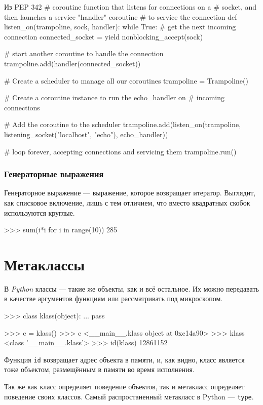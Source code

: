 \begin{pylst}{Из PEP 342}{}
# coroutine function that listens for connections on a
# socket, and then launches a service "handler" coroutine
# to service the connection
def listen_on(trampoline, sock, handler):
    while True:
        # get the next incoming connection
        connected_socket = yield nonblocking_accept(sock)

        # start another coroutine to handle the connection
        trampoline.add(handler(connected_socket))

# Create a scheduler to manage all our coroutines
trampoline = Trampoline()

# Create a coroutine instance to run the echo_handler on
# incoming connections

# Add the coroutine to the scheduler
trampoline.add(listen_on(trampoline,
                         listening_socket("localhost", "echo"),
                         echo_handler))

# loop forever, accepting connections and servicing them
trampoline.run()
\end{pylst}

\subsubsection{Генераторные выражения}
Генераторное выражение --- выражение, которое возвращает итератор. Выглядит, как списковое включение, лишь с тем отличием, что вместо квадратных скобок используются круглые.
\begin{pylst}{}{}
>>> sum(i*i for i in range(10))
285
\end{pylst}

\section{Метаклассы}
В \emph{Python} классы — такие же объекты, как и всё остальное. Их можно передавать в качестве аргументов функциям или рассматривать под микроскопом.
\begin{pylst}{}{}
>>> class klass(object):
...     pass

>>> c = klass()
>>> c
<__main__.klass object at 0xc14a90>
>>> klass
<class '__main__.klass'>
>>> id(klass)
12861152
\end{pylst}

Функция \lstinline{id} возвращает адрес объекта в памяти, и, как видно, класс является тоже объектом, размещённым в памяти во  время исполнения.

Так же как класс определяет поведение объектов, так и метакласс определяет поведение своих классов. Самый распростаненный метакласс в Python — \lstinline{type}.

